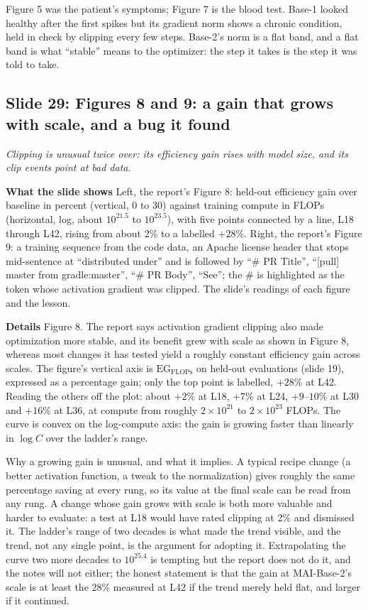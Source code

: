 \documentclass[11pt,letterpaper]{article}
\newcommand{\slide}[3]{%
  \subsection[Slide #1: #2]{Slide #1: #2}%
  {\color{muted}\itshape #3\par}\medskip}
\newcommand{\para}[1]{\medskip\noindent\textbf{#1}\quad}
\newenvironment{intuition}{\begin{tcolorbox}[intuitionbox]}{\end{tcolorbox}}
\begin{document}
\begin{intuition}
Figure 5 was the patient's symptoms; Figure 7 is the blood test. Base-1 looked healthy after the first spikes but its gradient norm shows a chronic condition, held in check by clipping every few steps. Base-2's norm is a flat band, and a flat band is what ``stable'' means to the optimizer: the step it takes is the step it was told to take.
\end{intuition}

\slide{29}{Figures 8 and 9: a gain that grows with scale, and a bug it found}{Clipping is unusual twice over: its efficiency gain rises with model size, and its clip events point at bad data.}

\para{What the slide shows} Left, the report's Figure 8: held-out efficiency gain over baseline in percent (vertical, 0 to 30) against training compute in FLOPs (horizontal, log, about $10^{21.5}$ to $10^{23.5}$), with five points connected by a line, L18 through L42, rising from about 2\% to a labelled $+28\%$. Right, the report's Figure 9: a training sequence from the code data, an Apache license header that stops mid-sentence at ``distributed under'' and is followed by ``\# PR Title'', ``[pull] master from gradle:master'', ``\# PR Body'', ``See''; the \# is highlighted as the token whose activation gradient was clipped. The slide's readings of each figure and the lesson.

\para{Details} Figure 8. The report says activation gradient clipping also made optimization more stable, and its benefit grew with scale as shown in Figure 8, whereas most changes it has tested yield a roughly constant efficiency gain across scales. The figure's vertical axis is $\text{EG}_{\text{FLOPs}}$ on held-out evaluations (slide 19), expressed as a percentage gain; only the top point is labelled, $+28\%$ at L42. Reading the others off the plot: about $+2\%$ at L18, $+7\%$ at L24, $+9$--$10\%$ at L30 and $+16\%$ at L36, at compute from roughly $2\times10^{21}$ to $2\times10^{23}$ FLOPs. The curve is convex on the log-compute axis: the gain is growing faster than linearly in $\log C$ over the ladder's range.

Why a growing gain is unusual, and what it implies. A typical recipe change (a better activation function, a tweak to the normalization) gives roughly the same percentage saving at every rung, so its value at the final scale can be read from any rung. A change whose gain grows with scale is both more valuable and harder to evaluate: a test at L18 would have rated clipping at 2\% and dismissed it. The ladder's range of two decades is what made the trend visible, and the trend, not any single point, is the argument for adopting it. Extrapolating the curve two more decades to $10^{25.4}$ is tempting but the report does not do it, and the notes will not either; the honest statement is that the gain at MAI-Base-2's scale is at least the 28\% measured at L42 if the trend merely held flat, and larger if it continued.
\end{document}
